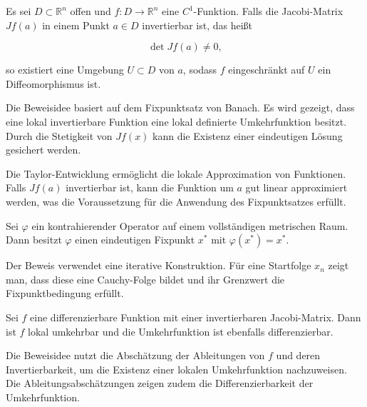 \begin{satz}{}
Es sei $ D \subset \mathbb{R}^n $ offen und $ f: D \to \mathbb{R}^n $ eine $ C^1 $-Funktion. Falls die Jacobi-Matrix $ Jf(a) $ in einem Punkt $ a \in D $ invertierbar ist, das heißt


$$
\det Jf(a) \neq 0,
$$


so existiert eine Umgebung $ U \subset D $ von $ a $, sodass $ f $ eingeschränkt auf $ U $ ein Diffeomorphismus ist.
\end{satz}

\begin{beweisbox}
Die Beweisidee basiert auf dem Fixpunktsatz von Banach. Es wird gezeigt, dass eine lokal invertierbare Funktion eine lokal definierte Umkehrfunktion besitzt. Durch die Stetigkeit von $ Jf(x) $ kann die Existenz einer eindeutigen Lösung gesichert werden.
\end{beweisbox}

\begin{motivationbox}
Die Taylor-Entwicklung ermöglicht die lokale Approximation von Funktionen. Falls $ Jf(a) $ invertierbar ist, kann die Funktion um $ a $ gut linear approximiert werden, was die Voraussetzung für die Anwendung des Fixpunktsatzes erfüllt.
\end{motivationbox}

\begin{satz}{}
Sei $ \varphi $ ein kontrahierender Operator auf einem vollständigen metrischen Raum. Dann besitzt $ \varphi $ einen eindeutigen Fixpunkt $ x^* $ mit $ \varphi(x^*) = x^* $.
\end{satz}

\begin{beweisbox}
Der Beweis verwendet eine iterative Konstruktion. Für eine Startfolge $ x_n $ zeigt man, dass diese eine Cauchy-Folge bildet und ihr Grenzwert die Fixpunktbedingung erfüllt.
\end{beweisbox}

\begin{satz}{}
Sei $ f $ eine differenzierbare Funktion mit einer invertierbaren Jacobi-Matrix. Dann ist $ f $ lokal umkehrbar und die Umkehrfunktion ist ebenfalls differenzierbar.
\end{satz}

\begin{beweisbox}
Die Beweisidee nutzt die Abschätzung der Ableitungen von $ f $ und deren Invertierbarkeit, um die Existenz einer lokalen Umkehrfunktion nachzuweisen. Die Ableitungsabschätzungen zeigen zudem die Differenzierbarkeit der Umkehrfunktion.
\end{beweisbox}

